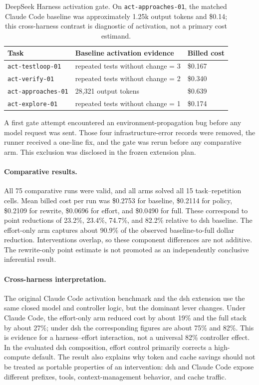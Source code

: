 \documentclass[11pt]{article}
\newcommand{\cc}{Claude Code}
\begin{document}
\begin{table}[ht]\centering\small
\begin{tabular}{lll}
\toprule
Task & Baseline activation evidence & Billed cost \\
\midrule
\texttt{act-testloop-01} & repeated tests without change = 3 & \$0.167 \\
\texttt{act-verify-01} & repeated tests without change = 2 & \$0.340 \\
\texttt{act-approaches-01} & 28,321 output tokens & \$0.639 \\
\texttt{act-explore-01} & repeated tests without change = 1 & \$0.174 \\
\bottomrule
\end{tabular}
\caption{DeepSeek Harness activation gate. On \texttt{act-approaches-01},
the matched \cc{} baseline was approximately 1.25k output tokens and \$0.14;
this cross-harness contrast is diagnostic of activation, not a primary cost
estimand.}
\label{tab:dsh-gate}
\end{table}

A first gate attempt encountered an environment-propagation bug before any
model request was sent. Those four infrastructure-error records were removed,
the runner received a one-line fix, and the gate was rerun before any
comparative arm. This exclusion was disclosed in the frozen extension plan.

\paragraph{Comparative results.} All 75 comparative runs were valid, and all
arms solved all 15 task--repetition cells. Mean billed cost per run was
\$0.2753 for baseline, \$0.2114 for policy, \$0.2109 for rewrite, \$0.0696 for
effort, and \$0.0490 for full. These correspond to point reductions of 23.2\%,
23.4\%, 74.7\%, and 82.2\% relative to dsh baseline. The effort-only arm
captures about 90.9\% of the observed baseline-to-full dollar reduction.
Interventions overlap, so these component differences are not additive. The
rewrite-only point estimate is not promoted as an independently conclusive
inferential result.

\paragraph{Cross-harness interpretation.} The original \cc{} activation
benchmark and the dsh extension use the same closed model and controller logic,
but the dominant lever changes. Under \cc{}, the effort-only arm reduced cost
by about 19\% and the full stack by about 27\%; under dsh the corresponding
figures are about 75\% and 82\%. This is evidence for a harness--effort
interaction, not a universal 82\% controller effect. In the evaluated dsh
composition, effort control primarily corrects a high-compute default. The
result also explains why token and cache savings should not be treated as
portable properties of an intervention: dsh and \cc{} expose different
prefixes, tools, context-management behavior, and cache traffic.
\end{document}
